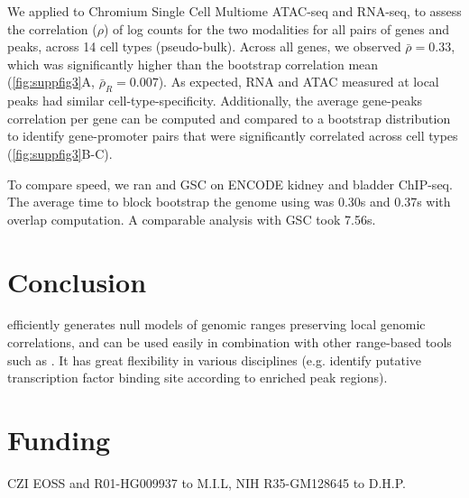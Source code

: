 
We applied \bootranges to
Chromium Single Cell Multiome
ATAC-seq and RNA-seq, to assess the correlation ($\rho$) of log counts for the two
modalities for all pairs of genes and peaks, across
14 cell types (pseudo-bulk). Across all genes, we observed
$\bar{\rho} = 0.33$, which was 
significantly higher than the bootstrap correlation mean
(\cref{fig:suppfig3}A, $\bar{\rho}_{R} = 0.007$). As expected, RNA
and ATAC measured at local peaks had similar cell-type-specificity.
Additionally, the average gene-peaks correlation per gene can be
computed and compared to a bootstrap distribution to
identify gene-promoter pairs that were significantly correlated across
cell types (\cref{fig:suppfig3}B-C).


To compare speed, we ran \bootranges and GSC on
ENCODE kidney and bladder ChIP-seq. The average time to
block bootstrap the genome using \bootranges was 0.30s and
0.37s with overlap computation. A comparable analysis with GSC took
7.56s.


\vspace*{-20pt}
\section{Conclusion}

\bootranges efficiently generates null models of genomic ranges preserving 
local genomic correlations, and can be used easily in combination with
other range-based tools such as \plyranges.
It has great flexibility in various disciplines (e.g. identify
putative transcription factor binding site according to enriched peak
regions).


\vspace*{-20pt}

\section*{Funding}
CZI EOSS and R01-HG009937 to M.I.L, NIH R35-GM128645 to D.H.P.

\vspace*{-20pt}
